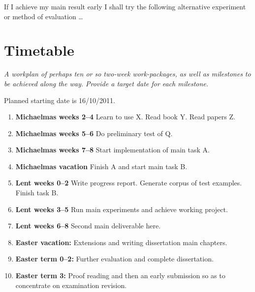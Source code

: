 \documentclass[12pt,a4paper,twoside]{article}
\begin{document}
If I achieve my main result early I shall try the following
alternative experiment or method of evaluation \ldots


\section*{Timetable}

\emph{A workplan of perhaps ten or so two-week work-packages,
as well as milestones to be achieved along the way. Provide a
target date for each milestone.}

Planned starting date is 16/10/2011.

\begin{enumerate}

\item \textbf{Michaelmas weeks 2--4} Learn to use X. Read book Y. Read papers Z.

\item \textbf{Michaelmas weeks 5--6} Do preliminary test of Q.

\item \textbf{Michaelmas weeks 7--8} Start implementation of main task A.

\item \textbf{Michaelmas vacation} Finish A and start main task B.

\item \textbf{Lent weeks 0--2} Write progress report. Generate corpus of
  test examples. Finish task B.

\item \textbf{Lent weeks 3--5} Run main experiments and achieve working project.

\item \textbf{Lent weeks 6--8} Second main deliverable here.

\item \textbf{Easter vacation:} Extensions and writing dissertation main
  chapters.

\item \textbf{Easter term 0--2:}  Further evaluation and complete dissertation.

\item \textbf{Easter term 3:} Proof reading and then an early submission
  so as to concentrate on examination revision.

\end{enumerate}

\printbibliography
\end{document}

